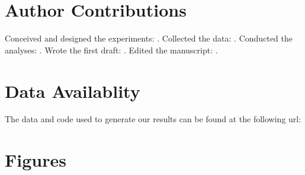 \documentclass[11pt,letterpaper]{article} %
\begin{document}
\section*{Author Contributions}
Conceived and designed the experiments: .
Collected the data: .
Conducted the analyses: .
Wrote the first draft: .
Edited the manuscript: .


\section*{Data Availablity}
The data and code used to generate our results can be found at the following url: 





\section*{Figures}



\end{document}
